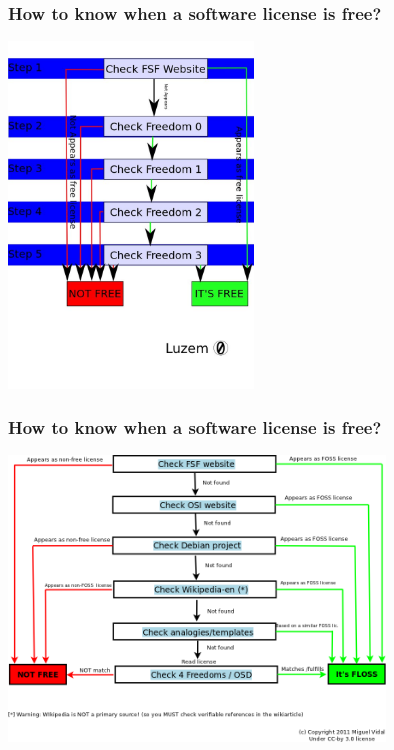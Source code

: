 \documentclass{beamer}
\begin{document}
\begin{frame}
\frametitle{How to know when a software license is free?}

\begin{center}
\includegraphics[width=6.5cm]{figs/chart.jpg}
\end{center}

\end{frame}


\begin{frame}
\frametitle{How to know when a software license is free?}

\begin{center}
\includegraphics[width=10cm]{figs/flowchart-licenses.png}
\end{center}

\end{frame}


\end{document}
